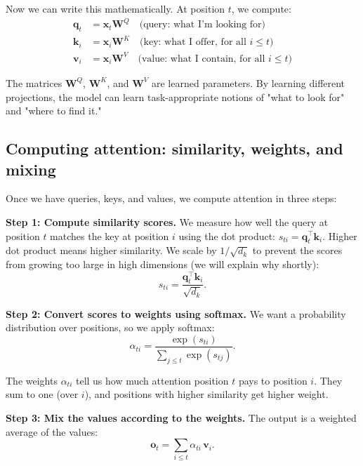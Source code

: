 Now we can write this mathematically. At position $t$, we compute:
\begin{align}
\mathbf{q}_t &= \mathbf{x}_t \mathbf{W}^Q \quad \text{(query: what I'm looking for)} \\
\mathbf{k}_i &= \mathbf{x}_i \mathbf{W}^K \quad \text{(key: what I offer, for all } i \le t \text{)} \\
\mathbf{v}_i &= \mathbf{x}_i \mathbf{W}^V \quad \text{(value: what I contain, for all } i \le t \text{)}
\end{align}

The matrices $\mathbf{W}^Q$, $\mathbf{W}^K$, and $\mathbf{W}^V$ are learned parameters. By learning different projections, the model can learn task-appropriate notions of "what to look for" and "where to find it."

\subsection{Computing attention: similarity, weights, and mixing}
\label{sec:attention_computation}

Once we have queries, keys, and values, we compute attention in three steps:

\textbf{Step 1: Compute similarity scores.} We measure how well the query at position $t$ matches the key at position $i$ using the dot product: $s_{ti} = \mathbf{q}_t^\top \mathbf{k}_i$. Higher dot product means higher similarity. We scale by $1/\sqrt{d_k}$ to prevent the scores from growing too large in high dimensions (we will explain why shortly):
\begin{equation}
s_{ti} = \frac{\mathbf{q}_t^\top \mathbf{k}_i}{\sqrt{d_k}}.
\end{equation}

\textbf{Step 2: Convert scores to weights using softmax.} We want a probability distribution over positions, so we apply softmax:
\begin{equation}
\alpha_{ti} = \frac{\exp(s_{ti})}{\sum_{j\le t}\exp(s_{tj})}.
\end{equation}

The weights $\alpha_{ti}$ tell us how much attention position $t$ pays to position $i$. They sum to one (over $i$), and positions with higher similarity get higher weight.

\textbf{Step 3: Mix the values according to the weights.} The output is a weighted average of the values:
\begin{equation}
\mathbf{o}_t = \sum_{i\le t}\alpha_{ti}\,\mathbf{v}_i.
\label{eq:attention_output}
\end{equation}

